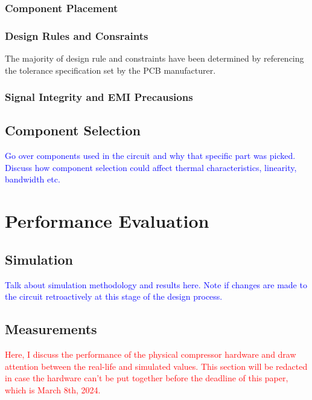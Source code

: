 \documentclass[10pt]{article}
\begin{document}
\begin{multicols*}{2}
                \subsubsection{Component Placement}

                \subsubsection{Design Rules and Consraints}
                    The majority of design rule and constraints have been determined by referencing the tolerance specification set by the PCB manufacturer. 

                \subsubsection{Signal Integrity and EMI Precausions}

            \subsection{Component Selection}
                \textcolor{blue}{Go over components used in the circuit and why that specific part was picked. Discuss how component selection could affect thermal characteristics, linearity, bandwidth etc.}
        
        \section{Performance Evaluation}

            \subsection{Simulation}
                \textcolor{blue}{Talk about simulation methodology and results here. Note if changes are made to the circuit retroactively at this stage of the design process.}

            \subsection{Measurements}
                \textcolor{red}{Here, I discuss the performance of the physical compressor hardware and draw attention between the real-life and simulated values. This section will be redacted in case the hardware can't be put together before the deadline of this paper, which is March 8th, 2024.}
        

\end{multicols*}
\end{document}

